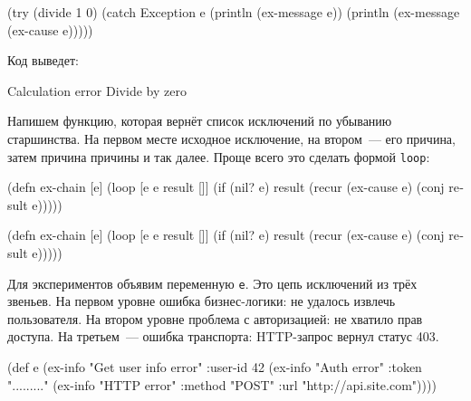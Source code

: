 \else

\begin{english}
  \begin{clojure}
(try
  (divide 1 0)
  (catch Exception e
    (println (ex-message e))
    (println (ex-message (ex-cause e)))))
  \end{clojure}
\end{english}

\fi

\noindent
Код выведет:

\begin{english}
  \begin{text}
Calculation error
Divide by zero
  \end{text}
\end{english}

Напишем функцию, которая вернёт список исключений по убыванию
старшинства. На первом месте исходное исключение, на втором~--- его причина, затем
причина причины и так далее. Проще всего это сделать формой \verb|loop|:


\ifnarrow

\begin{english}
  \begin{clojure}
(defn ex-chain [e]
  (loop [e e
         result []]
    (if (nil? e)
      result
      (recur (ex-cause e)
        (conj result e)))))
  \end{clojure}
\end{english}

\else

\begin{english}
  \begin{clojure}
(defn ex-chain [e]
  (loop [e e
         result []]
    (if (nil? e)
      result
      (recur (ex-cause e) (conj result e)))))
  \end{clojure}
\end{english}

\fi

Для экспериментов объявим переменную \verb|e|. Это цепь исключений из трёх
звеньев. На первом уровне ошибка бизнес-логики: не удалось извлечь
пользователя. На втором уровне проблема с авторизацией: не хватило прав
доступа. На третьем~--- ошибка транспорта: HTTP-запрос вернул статус 403.

\label{e-sample}

\ifnarrow

\begin{english}
  \begin{clojure}
(def e
  (ex-info
   "Get user info error"
   {:user-id 42}
   (ex-info
     "Auth error"
     {:token "........."}
     (ex-info
       "HTTP error"
       {:method "POST"
        :url "http://api.site.com"}))))
  \end{clojure}
\end{english}

